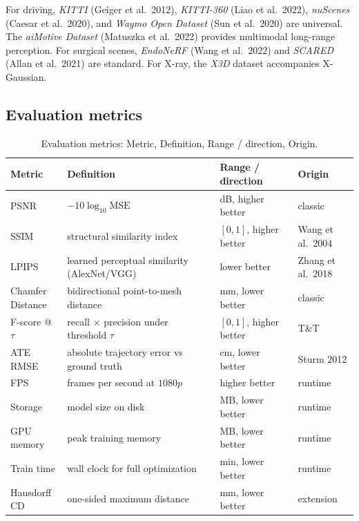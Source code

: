 \documentclass{article}
\begin{document}
For driving, \emph{KITTI} (Geiger et al.~2012), \emph{KITTI-360} (Liao et al.~2022), \emph{nuScenes} (Caesar et al.~2020), and \emph{Waymo Open Dataset} (Sun et al.~2020) are universal. The \emph{aiMotive Dataset} (Matuszka et al.~2022) provides multimodal long-range perception. For surgical scenes, \emph{EndoNeRF} (Wang et al.~2022) and \emph{SCARED} (Allan et al.~2021) are standard. For X-ray, the \emph{X3D} dataset accompanies X-Gaussian.

\subsection{Evaluation metrics}\label{evaluation-metrics}

\begin{table}[t]
\centering
\caption{Evaluation metrics: Metric, Definition, Range / direction, Origin.}
\label{tab:evaluation-metrics}
\begin{tabular}{>{\raggedright\arraybackslash}p{0.1633\linewidth}
  >{\raggedright\arraybackslash}p{0.4388\linewidth}
  >{\raggedright\arraybackslash}p{0.2245\linewidth}
  >{\raggedright\arraybackslash}p{0.1735\linewidth}}
\toprule
\textbf{Metric} & \textbf{Definition} & \textbf{Range / direction} & \textbf{Origin} \\
\midrule
PSNR & \(-10\log_{10}\mathrm{MSE}\) & dB, higher better & classic \\
SSIM & structural similarity index & \([0,1]\), higher better & Wang et al.~2004 \\
LPIPS & learned perceptual similarity (AlexNet/VGG) & lower better & Zhang et al.~2018 \\
Chamfer Distance & bidirectional point-to-mesh distance & mm, lower better & classic \\
F-score @ \(\tau\) & recall × precision under threshold \(\tau\) & \([0,1]\), higher better & T\&T \\
ATE RMSE & absolute trajectory error vs ground truth & cm, lower better & Sturm 2012 \\
FPS & frames per second at \(1080p\) & higher better & runtime \\
Storage & model size on disk & MB, lower better & runtime \\
GPU memory & peak training memory & MB, lower better & runtime \\
Train time & wall clock for full optimization & min, lower better & runtime \\
Hausdorff CD & one-sided maximum distance & mm, lower better & extension \\
\end{tabular}
\end{table}
\end{document}
